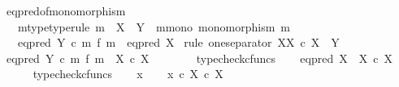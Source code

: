 \begin{isabellebody}
\isanewline
{}\isamarkupfalse%
\ eq{\isacharunderscore}{\kern0pt}pred{\isacharunderscore}{\kern0pt}of{\isacharunderscore}{\kern0pt}monomorphism{\isacharcolon}{\kern0pt}\isanewline
\ \ \ m{\isacharunderscore}{\kern0pt}type{\isacharbrackleft}{\kern0pt}type{\isacharunderscore}{\kern0pt}rule{\isacharbrackright}{\kern0pt}{\isacharcolon}{\kern0pt}\ {\isachardoublequoteopen}m\ {\isacharcolon}{\kern0pt}\ X\ {\isasymrightarrow}\ Y{\isachardoublequoteclose}\ \ m{\isacharunderscore}{\kern0pt}mono{\isacharcolon}{\kern0pt}\ {\isachardoublequoteopen}monomorphism\ m{\isachardoublequoteclose}\isanewline
\ \ \ {\isachardoublequoteopen}eq{\isacharunderscore}{\kern0pt}pred\ Y\ {\isasymcirc}\isactrlsub c\ {\isacharparenleft}{\kern0pt}m\ {\isasymtimes}\isactrlsub f\ m{\isacharparenright}{\kern0pt}\ {\isacharequal}{\kern0pt}\ eq{\isacharunderscore}{\kern0pt}pred\ X{\isachardoublequoteclose}\isanewline
%
\isadelimproof
%
\endisadelimproof
%
\isatagproof
{}\isamarkupfalse%
\ {\isacharparenleft}{\kern0pt}rule\ one{\isacharunderscore}{\kern0pt}separator{\isacharbrackleft}{\kern0pt}\ X{\isacharequal}{\kern0pt}{\isachardoublequoteopen}X\ {\isasymtimes}\isactrlsub c\ X{\isachardoublequoteclose}{\isacharcomma}{\kern0pt}\ \ Y{\isacharequal}{\kern0pt}{\isasymOmega}{\isacharbrackright}{\kern0pt}{\isacharparenright}{\kern0pt}\isanewline
\ \ \isamarkupfalse%
\ {\isachardoublequoteopen}eq{\isacharunderscore}{\kern0pt}pred\ Y\ {\isasymcirc}\isactrlsub c\ m\ {\isasymtimes}\isactrlsub f\ m\ {\isacharcolon}{\kern0pt}\ X\ {\isasymtimes}\isactrlsub c\ X\ {\isasymrightarrow}\ {\isasymOmega}{\isachardoublequoteclose}\isanewline
\ \ \ \ \isamarkupfalse%
\ typecheck{\isacharunderscore}{\kern0pt}cfuncs\isanewline
\ \ \isamarkupfalse%
\ {\isachardoublequoteopen}eq{\isacharunderscore}{\kern0pt}pred\ X\ {\isacharcolon}{\kern0pt}\ X\ {\isasymtimes}\isactrlsub c\ X\ {\isasymrightarrow}\ {\isasymOmega}{\isachardoublequoteclose}\isanewline
\ \ \ \ \isamarkupfalse%
\ typecheck{\isacharunderscore}{\kern0pt}cfuncs\isanewline
{}\isamarkupfalse%
\isanewline
\ \ \isamarkupfalse%
\ x\isanewline
\ \ \isamarkupfalse%
\ {\isachardoublequoteopen}x\ {\isasymin}\isactrlsub c\ X\ {\isasymtimes}\isactrlsub c\ X{\isachardoublequoteclose}\isanewline
\ \ \isamarkupfalse%
\ \isamarkupfalse%

\end{isabellebody}
